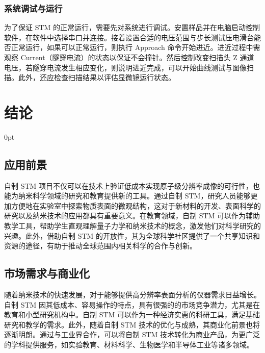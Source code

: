 \documentclass[zihao=-4]{ctexart}
\newcommand{\setParDis}{\setlength {\parskip} {0pt} }
\begin{document}
\begin{spacing}{1.5}
			
			
		\subsubsection{系统调试与运行}
			为了保证 STM 的正常运行，需要先对系统进行调试。安置样品并在电脑启动控制软件，在软件中选择串口并连接。接着设置合适的电压范围与步长测试压电滑台能否正常运行，如果可以正常运行，则执行 Approach 命令开始进近。进近过程中需观察 Current（隧穿电流）的状态以保证不会撞针。然后控制改变扫描头 Z 通道电压，若隧穿电流发生相应变化，则说明进近完成，可以开始曲线测试与图像扫描。此外，还应检查扫描结果以评估显微镜运行状态。
			
			
			
			
		
	
	
	
	
	
	
\clearpage
\setcounter{section}{5}	 	%
\setcounter{subsection}{0}	%
	

\section*{结论}
{} %
\setParDis %
	\subsection{应用前景}
		自制 STM 项目不仅可以在技术上验证低成本实现原子级分辨率成像的可行性，也能为纳米科学领域的研究和教育提供新的工具。通过自制 STM，研究人员能够更加方便地在实验室中探索物质表面的微观结构，这对于新材料的开发、表面科学的研究以及纳米技术的应用都具有重要意义。在教育领域，自制 STM 可以作为辅助教学工具，帮助学生直观理解量子力学和纳米技术的概念，激发他们对科学研究的兴趣。此外，借助自制 STM 的开放性，其为全球科学社区提供了一个共享知识和资源的途径，有助于推动全球范围内相关科学的合作与创新。
	
	
	\subsection{市场需求与商业化}
		随着纳米技术的快速发展，对于能够提供高分辨率表面分析的仪器需求日益增长。自制 STM 因其低成本、容易操作的特点，具有很强的的市场竞争潜力，尤其是在教育和小型研究机构中。自制 STM 可以作为一种经济实惠的科研工具，满足基础研究和教学的需求。此外，随着自制 STM 技术的优化与成熟，其商业化前景也将逐渐明朗。通过与工业界合作，可以将自制 STM 技术转化为商业产品，为更广泛的学科提供服务，如实验教育、材料科学、生物医学和半导体工业等诸多领域。
	

\end{spacing}
\end{document}
